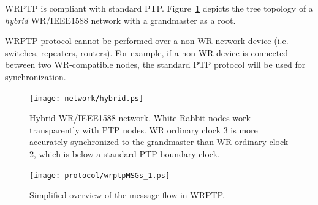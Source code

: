 \documentclass[a4paper, 12pt]{article}
\begin{document}
WRPTP is compliant with standard PTP. Figure~\ref{fig:hybrid-network} depicts the tree topology 
of a \emph{hybrid} WR/IEEE1588 network with a grandmaster as a root. 

WRPTP protocol cannot be performed over a non-WR network device (i.e. switches, repeaters, routers). 
For example, if a non-WR device is connected between two WR-compatible nodes, 
the standard PTP protocol will be used for synchronization. 


\begin{figure}[ht!]
  \centering
  \texttt{[image: network/hybrid.ps]}
  \caption{Hybrid WR/IEEE1588 network. White Rabbit nodes work
    transparently with PTP nodes. WR ordinary clock 3 is more accurately
      synchronized to the grandmaster than WR ordinary clock 2, which
      is below a standard PTP boundary clock.}
  \label{fig:hybrid-network}
\end{figure}


\begin{figure}[ht!]
  \centering
  \texttt{[image: protocol/wrptpMSGs\_1.ps]}
  \caption{Simplified overview of the message flow in WRPTP.}
  \label{fig:wrptpMSGs}
\end{figure}

\newpage 
\end{document}
